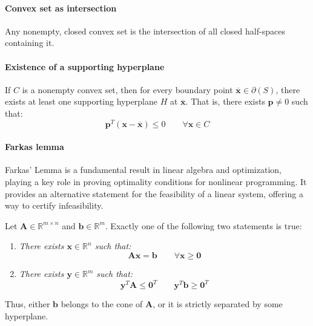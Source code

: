 \paragraph*{Convex set as intersection}
Any nonempty, closed convex set is the intersection of all closed half-spaces containing it.

\paragraph*{Existence of a supporting hyperplane}
If $C$ is a nonempty convex set, then for every boundary point $\overline{\mathbf{x}}\in\partial(S)$, there exists at least one supporting hyperplane $H$ at $\overline{\mathbf{x}}$. 
That is, there exists $\mathbf{p}\neq 0$ such that: 
\[\mathbf{p}^T(\mathbf{x}-\overline{\mathbf{x}})\leq 0\qquad\forall\mathbf{x}\in C\]

\paragraph*{Farkas lemma}
Farkas' Lemma is a fundamental result in linear algebra and optimization, playing a key role in proving optimality conditions for nonlinear programming. 
It provides an alternative statement for the feasibility of a linear system, offering a way to certify infeasibility.
\begin{lemma}
    Let $\mathbf{A}\in\mathbb{R}^{m\times n}$ and $\mathbf{b}\in\mathbb{R}^m$. 
    Exactly one of the following two statements is true:
\end{lemma}
\begin{enumerate}
    \item \textit{There exists $\mathbf{x}\in\mathbb{R}^n$ such that:}
        \[\mathbf{A}\mathbf{x}=\mathbf{b}\qquad\forall\mathbf{x}\geq \mathbf{0}\]
    \item \textit{There exists $\mathbf{y}\in\mathbb{R}^m$ such that:}
        \[\mathbf{y}^T\mathbf{A}\leq\mathbf{0}^T\qquad\mathbf{y}^T\mathbf{b}\geq\mathbf{0}^T\]
\end{enumerate}
Thus, either $\mathbf{b}$ belongs to the cone of $\mathbf{A}$, or it is strictly separated by some hyperplane.

